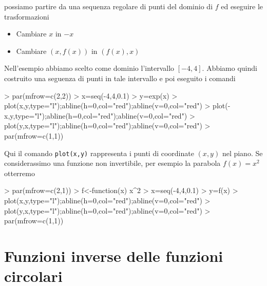 \documentclass[onecolumn,11pt]{book}
\begin{document}
possiamo partire da una sequenza regolare di punti del dominio  di $f$ ed eseguire le trasformazioni
\begin{itemize}
\item Cambiare $x$ in $-x$
\item Cambiare $(x,f(x))$ in $(f(x),x)$
\end{itemize}
Nell'esempio abbiamo scelto come dominio l'intervallo $[-4,4]$. Abbiamo quindi costruito una seguenza di punti in tale intervallo e poi eseguito i comandi
\begin{Schunk}
\begin{Sinput}
> par(mfrow=c(2,2))
> x=seq(-4,4,0.1)
> y=exp(x)
> plot(x,y,type="l");abline(h=0,col="red");abline(v=0,col="red")
> plot(-x,y,type="l");abline(h=0,col="red");abline(v=0,col="red")
> plot(y,x,type="l");abline(h=0,col="red");abline(v=0,col="red")
> par(mfrow=c(1,1))
\end{Sinput}
\end{Schunk}
Qui il comando \texttt{plot(x,y)} rappresenta i punti di coordinate $(x,y)$ nel piano.
Se considerassimo una funzione non invertibile, per esempio la parabola
$f(x)=x^2$
otterremo
\begin{Schunk}
\begin{Sinput}
> par(mfrow=c(2,1))
> f<-function(x) x^2
> x=seq(-4,4,0.1)
> y=f(x)
> plot(x,y,type="l");abline(h=0,col="red");abline(v=0,col="red")
> plot(y,x,type="l");abline(h=0,col="red");abline(v=0,col="red")
> par(mfrow=c(1,1))
\end{Sinput}
\end{Schunk}
\section{Funzioni inverse delle funzioni circolari}
\end{document}
